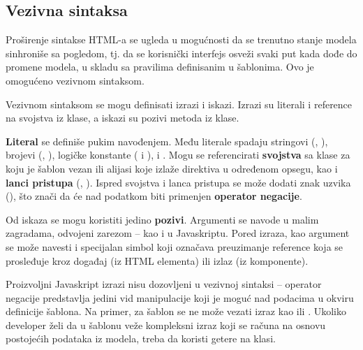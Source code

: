 \subsection{Vezivna sintaksa}

Proširenje sintakse HTML-a se ugleda u mogućnosti da se trenutno stanje modela sinhroniše sa pogledom, tj. da se korisnički interfejs osveži svaki put kada dođe do promene modela, u skladu sa pravilima definisanim u šablonima.
Ovo je omogućeno vezivnom sintaksom.

Vezivnom sintaksom se mogu definisati izrazi i iskazi.
Izrazi su literali i reference na svojstva iz klase, a iskazi su pozivi metoda iz klase.

\textbf{Literal} se definiše pukim navođenjem.
Među literale spadaju stringovi (, ), brojevi (, ), logičke konstante ( i ),  i .
Mogu se referencirati \textbf{svojstva} sa klase za koju je šablon vezan ili alijasi koje izlaže direktiva u određenom opsegu, kao i \textbf{lanci pristupa} (, ).
Ispred svojstva i lanca pristupa se može dodati znak uzvika (\code{!}), što znači da će nad podatkom biti primenjen \textbf{operator negacije}.

Od iskaza se mogu koristiti jedino \textbf{pozivi}. Argumenti se navode u malim zagradama, odvojeni zarezom -- kao i u Javaskriptu.
Pored izraza, kao argument se može navesti i specijalan simbol \code{\#} koji označava preuzimanje reference koja se prosleđuje kroz događaj (iz HTML elementa) ili izlaz (iz komponente).

Proizvoljni Javaskript izrazi nisu dozovljeni u vezivnoj sintaksi -- operator negacije predstavlja jedini vid manipulacije koji je moguć nad podacima u okviru definicije šablona.
Na primer, za šablon se ne može vezati izraz kao  ili .
Ukoliko developer želi da u šablonu veže kompleksni izraz koji se računa na osnovu postojećih podataka iz modela, treba da koristi getere na klasi.


